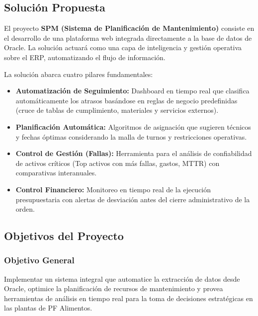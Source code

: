 \documentclass[11pt, letterpaper]{article}
\begin{document}
\subsection{Solución Propuesta}
El proyecto \textbf{SPM (Sistema de Planificación de Mantenimiento)} consiste en el desarrollo de una plataforma web integrada directamente a la base de datos de Oracle. La solución actuará como una capa de inteligencia y gestión operativa sobre el ERP, automatizando el flujo de información.

La solución abarca cuatro pilares fundamentales:
\begin{itemize}
    \item \textbf{Automatización de Seguimiento:} Dashboard en tiempo real que clasifica automáticamente los atrasos basándose en reglas de negocio predefinidas (cruce de tablas de cumplimiento, materiales y servicios externos).
    \item \textbf{Planificación Automática:} Algoritmos de asignación que sugieren técnicos y fechas óptimas considerando la malla de turnos y restricciones operativas.
    \item \textbf{Control de Gestión (Fallas):} Herramienta para el análisis de confiabilidad de activos críticos (Top activos con más fallas, gastos, MTTR) con comparativas interanuales.
    \item \textbf{Control Financiero:} Monitoreo en tiempo real de la ejecución presupuestaria con alertas de desviación antes del cierre administrativo de la orden.
\end{itemize}

\subsection{Objetivos del Proyecto}

\subsubsection{Objetivo General}
Implementar un sistema integral que automatice la extracción de datos desde Oracle, optimice la planificación de recursos de mantenimiento y provea herramientas de análisis en tiempo real para la toma de decisiones estratégicas en las plantas de PF Alimentos.
\end{document}
